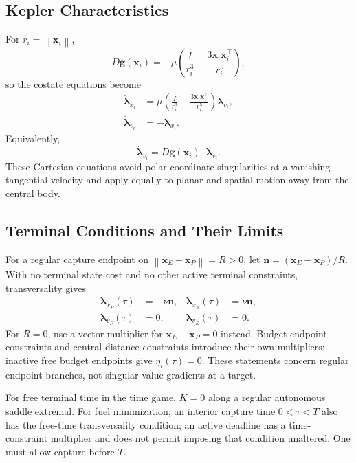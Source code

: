\documentclass[journal,a4paper]{IEEEtran}
\newcommand{\norm}[1]{\left\|#1\right\|}
\begin{document}
\subsection{Kepler Characteristics}
For $r_i=\norm{\mathbf x_i}$,
\begin{equation}
 D\mathbf g(\mathbf x_i)
 =-\mu\left(\frac{I}{r_i^3}
             -\frac{3\mathbf x_i\mathbf x_i^\top}{r_i^5}\right),
\end{equation}
so the costate equations become
\begin{align}
 \dot{\boldsymbol\lambda}_{x_i}
 &=\mu\left(\frac{I}{r_i^3}
             -\frac{3\mathbf x_i\mathbf x_i^\top}{r_i^5}\right)
                       \boldsymbol\lambda_{v_i},\label{eq:keplercostate}\\
 \dot{\boldsymbol\lambda}_{v_i}&=-\boldsymbol\lambda_{x_i}.
\end{align}
Equivalently,
\begin{equation}
 \ddot{\boldsymbol\lambda}_{v_i}
             =D\mathbf g(\mathbf x_i)^\top\boldsymbol\lambda_{v_i}.
\end{equation}
These Cartesian equations avoid polar-coordinate singularities at a vanishing tangential velocity and apply equally to planar and spatial motion away from the central body.

\subsection{Terminal Conditions and Their Limits}
For a regular capture endpoint on $\norm{\mathbf x_E-\mathbf x_P}=R>0$, let $\mathbf n=(\mathbf x_E-\mathbf x_P)/R$. With no terminal state cost and no other active terminal constraints, transversality gives
\begin{align}
 \boldsymbol\lambda_{x_P}(\tau)&=-\nu\mathbf n,&
 \boldsymbol\lambda_{x_E}(\tau)&=\nu\mathbf n,\label{eq:transversality}\\
 \boldsymbol\lambda_{v_P}(\tau)&=0,&
 \boldsymbol\lambda_{v_E}(\tau)&=0.\nonumber
\end{align}
For $R=0$, use a vector multiplier for $\mathbf x_E-\mathbf x_P=0$ instead. Budget endpoint constraints and central-distance constraints introduce their own multipliers; inactive free budget endpoints give $\eta_i(\tau)=0$. These statements concern regular endpoint branches, not singular value gradients at a target.

For free terminal time in the time game, $K=0$ along a regular autonomous saddle extremal. For fuel minimization, an interior capture time $0<\tau<T$ also has the free-time transversality condition; an active deadline has a time-constraint multiplier and does not permit imposing that condition unaltered. One must allow capture before $T$.
\end{document}
